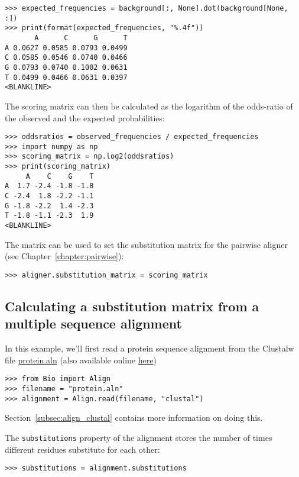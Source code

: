 \begin{verbatim}
>>> expected_frequencies = background[:, None].dot(background[None, :])
>>> print(format(expected_frequencies, "%.4f"))
       A      C      G      T
A 0.0627 0.0585 0.0793 0.0499
C 0.0585 0.0546 0.0740 0.0466
G 0.0793 0.0740 0.1002 0.0631
T 0.0499 0.0466 0.0631 0.0397
<BLANKLINE>
\end{verbatim}
The scoring matrix can then be calculated as the logarithm of the odds-ratio of the observed and the expected probabilities:

\begin{verbatim}
>>> oddsratios = observed_frequencies / expected_frequencies
>>> import numpy as np
>>> scoring_matrix = np.log2(oddsratios)
>>> print(scoring_matrix)
     A    C    G    T
A  1.7 -2.4 -1.8 -1.8
C -2.4  1.8 -2.2 -1.1
G -1.8 -2.2  1.4 -2.3
T -1.8 -1.1 -2.3  1.9
<BLANKLINE>
\end{verbatim}
The matrix can be used to set the substitution matrix for the pairwise aligner (see Chapter~\ref{chapter:pairwise}):

\begin{verbatim}
>>> aligner.substitution_matrix = scoring_matrix
\end{verbatim}

\subsection{Calculating a substitution matrix from a multiple sequence alignment}
\label{subsec:subs_mat_ex}

In this example, we'll first read a protein sequence alignment from the Clustalw file \href{examples/protein.aln}{protein.aln} (also available online
\href{https://raw.githubusercontent.com/biopython/biopython/master/Tests/Clustalw/protein.aln}{here})

\begin{verbatim}
>>> from Bio import Align
>>> filename = "protein.aln"
>>> alignment = Align.read(filename, "clustal")
\end{verbatim}

Section~\ref{subsec:align_clustal} contains more information on doing this.

The \verb+substitutions+ property of the alignment stores the number of times
different residues substitute for each other:
\begin{verbatim}
>>> substitutions = alignment.substitutions
\end{verbatim}

